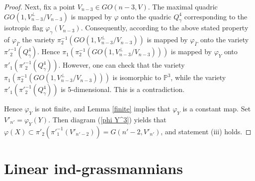 \documentclass[12pt]{amsart}
\renewcommand{\phi}{\varphi}
\theoremstyle{definition}
\begin{document}
\begin{proof}
Next, fix a point $V_{n-3}\in GO(n-3,V)$. The maximal quadric $GO(1,V_{n-3}^\bot/V_{n-3})$ is mapped by $\phi$ onto the
quadric $Q^4_{\gamma}$ corresponding to the isotropic flag $\phi_{\gamma}(V_{n-3})$. Consequently, according to
the above stated property of $\phi_{\bar{\Gamma}}$ the variety $\pi_2^{-1}(GO(1,V_{n-3}^\bot/V_{n-3}))$ is mapped by
$\phi_{\bar{\Gamma}}$ onto the variety ${\pi'}_2^{-1}(Q^4_{\gamma})$. Hence
$\pi_1(\pi_2^{-1}(GO(1,V_{n-3}^\bot/V_{n-3})))$ is mapped by $\phi_Y$ onto $\pi'_1({\pi'}_2^{-1}(Q^4_{\gamma}))$.
However, one can check that the variety $\pi_1(\pi_2^{-1}(GO(1,V_{n-3}^\bot/V_{n-3})))$ is isomorphic to $\mathbb{P}^3$,
while the variety $\pi'_1({\pi'}_2^{-1}(Q^4_{\gamma}))$ is 5-dimensional. This is a contradiction.

Hence $\phi_Y$ is not finite, and Lemma \ref{finite} implies that $\phi_Y$ is a constant map. Set $V'_{n'}=\phi_Y(Y)$.
Then diagram (\ref{phi Y^3}) yields that $\phi(X)\subset \pi'_2({\pi'}_1^{-1}(V'_{n'-2}))=G(n'-2,V'_{n'})$, and
statement (iii) holds.
\end{proof}











\vspace{1cm}

\section{Linear ind-grassmannians}\label{stand Gr}

\vspace{1cm}


\noindent
\end{document}

